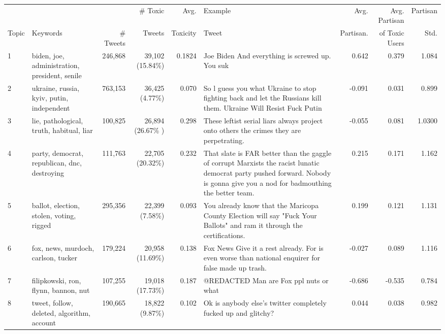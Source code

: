\begin{table}
\centering
\scriptsize
\selectfont
\setlength{\tabcolsep}{4pt}
\begin{tabularx}{\textwidth}{lXrrrXrrr}
\toprule
 &   &  &   \# Toxic & Avg.& Example & Avg.  & Avg. Partisan  & Partisan \\
 Topic& {Keywords}&\# Tweets &Tweets  & Toxicity &  Tweet  & Partisan. & of Toxic Users& Std. \\
\midrule
 1 & biden, joe, administration, president, senile  &246,868 & 39,102 (15.84\%) & 0.1824& Joe Biden And everything is screwed up. You suk & 0.642 &0.379 &1.084\\ 

 2 & ukraine, russia, kyiv, putin, independent &763,153 & 36,425 (4.77\%) &0.070 &  So l guess you what Ukraine to stop fighting back and let the Russians kill them. Ukraine Will Resist Fuck Putin& -0.091 &0.031 & 0.899\\ %

3 & lie, pathological, truth, habitual, liar  &100,825 & 26,894 (26.67\% ) &0.298 & These leftist serial liars always project onto others the crimes they are perpetrating. & -0.055 & 0.081 & 1.0300  \\

 4 & party, democrat, republican, dnc, destroying &111,763 & 22,705 (20.32\%) &0.232 & That slate is FAR better than the gaggle of corrupt Marxists the racist lunatic democrat party pushed forward. Nobody is gonna give you a nod for badmouthing the better team.
  &0.215&  0.171 & 1.162\\

  
 5& ballot, election, stolen, voting, rigged& 295,356 &  22,399 (7.58\%) &0.093 & You already know that the Maricopa County Election will say "Fuck Your Ballots" and ram it through the certifications.& 0.199 & 0.121 & 1.131 \\

  6 & fox, news, murdoch, carlson, tucker & 179,224 & 20,958 (11.69\%) &0.138 &Fox News Give it a rest already. For is even worse than national enquirer for false made up trash. & -0.027 & 0.089 & 1.116 \\

  7 & filipkowski, ron, flynn, bannon, nut & 107,255& 19,018 (17.73\%)&0.187 & @REDACTED Man are Fox ppl nuts or what &-0.686 & -0.535 & 0.784  \\

  8 & tweet, follow, deleted, algorithm, account & 190,665 & 18,822 (9.87\%)  &0.102& Ok is anybody else's twitter completely fucked up and glitchy?
 & 0.044 &  0.038 & 0.982\\


\end{tabularx}
\end{table}
